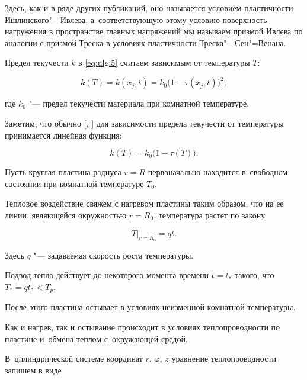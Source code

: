 Здесь, как и в ряде других публикаций, оно называется условием пластичности Ишлинского"--~Ивлева, а~соответствующую этому условию поверхность нагружения в пространстве главных напряжений мы называем призмой Ивлева по аналогии с призмой Треска в условиях пластичности Треска"--~Сен"=Венана. 

Предел текучести $k$ в \eqref{eq:ulg:5} считаем зависимым от температуры $T$:

\[

k(T)=k(x_{j} ,t)=k_{0} \bigl(1-\tau (x_{j} ,t)\bigr)^{2} ,

\] 

где  $k_{0} $ "--- предел текучести материала при комнатной температуре. 

Заметим, что обычно [, ] для зависимости предела текучести от температуры принимается линейная функция: 

$$

k(T)=k_{0} \bigl(1-\tau (T)\bigr).

$$



\smallskip




Пусть круглая пластина радиуса $r=R$ первоначально находится в~свободном состоянии при комнатной температуре $T_{0}$. 

Тепловое воздействие свяжем с нагревом пластины таким образом, что на ее линии, являющейся окружностью $r=R_{0}$, температура растет по закону



\begin{equation} 

\label{eq:ulg:6} 

T\bigr|_{r=R_{0}} =qt .

\end{equation} 

Здесь $q$ "--- задаваемая скорость роста температуры. 

Подвод тепла действует до некоторого момента времени $t=t_{*} $ такого, что $T_{*} =qt_{*} <T_{p} $. 

После этого пластина остывает в условиях неизменной комнатной температуры. 

Как и нагрев, так и остывание происходит в условиях теплопроводности по пластине и~обмена теплом с~окружающей средой. 

В~цилиндрической системе координат $r$, $\varphi $, $z$ уравнение теплопроводности запишем в виде

